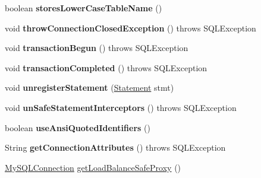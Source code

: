 \begin{DoxyCompactItemize}
boolean {\bfseries stores\+Lower\+Case\+Table\+Name} ()
\item 
\mbox{\label{interfacecom_1_1mysql_1_1jdbc_1_1_my_s_q_l_connection_a22ddc55e87152f14c467becdc2180735}} 
void {\bfseries throw\+Connection\+Closed\+Exception} ()  throws S\+Q\+L\+Exception
\item 
\mbox{\label{interfacecom_1_1mysql_1_1jdbc_1_1_my_s_q_l_connection_ad1407c3bb6b43b07cdd987d4fd3b7bc1}} 
void {\bfseries transaction\+Begun} ()  throws S\+Q\+L\+Exception
\item 
\mbox{\label{interfacecom_1_1mysql_1_1jdbc_1_1_my_s_q_l_connection_a7f280251ea8b2b82cecacb93dc0042d5}} 
void {\bfseries transaction\+Completed} ()  throws S\+Q\+L\+Exception
\item 
\mbox{\label{interfacecom_1_1mysql_1_1jdbc_1_1_my_s_q_l_connection_a477a950ab096b264dce39944471ee6fe}} 
void {\bfseries unregister\+Statement} (\mbox{\hyperlink{interfacecom_1_1mysql_1_1jdbc_1_1_statement}{Statement}} stmt)
\item 
\mbox{\label{interfacecom_1_1mysql_1_1jdbc_1_1_my_s_q_l_connection_ad2944eee6a5ea333d8c6d513415ea744}} 
void {\bfseries un\+Safe\+Statement\+Interceptors} ()  throws S\+Q\+L\+Exception
\item 
\mbox{\label{interfacecom_1_1mysql_1_1jdbc_1_1_my_s_q_l_connection_af6e78728b237b7f72bbb07140aa2ab9a}} 
boolean {\bfseries use\+Ansi\+Quoted\+Identifiers} ()
\item 
\mbox{\label{interfacecom_1_1mysql_1_1jdbc_1_1_my_s_q_l_connection_aa0e72fcd01942a46d5b5bcc6fcc89587}} 
String {\bfseries get\+Connection\+Attributes} ()  throws S\+Q\+L\+Exception
\item 
\mbox{\hyperlink{interfacecom_1_1mysql_1_1jdbc_1_1_my_s_q_l_connection}{My\+S\+Q\+L\+Connection}} \mbox{\hyperlink{interfacecom_1_1mysql_1_1jdbc_1_1_my_s_q_l_connection_aefbe0aa8c5652ee9534dd5354c8af220}{get\+Load\+Balance\+Safe\+Proxy}} ()

\end{DoxyCompactItemize}
